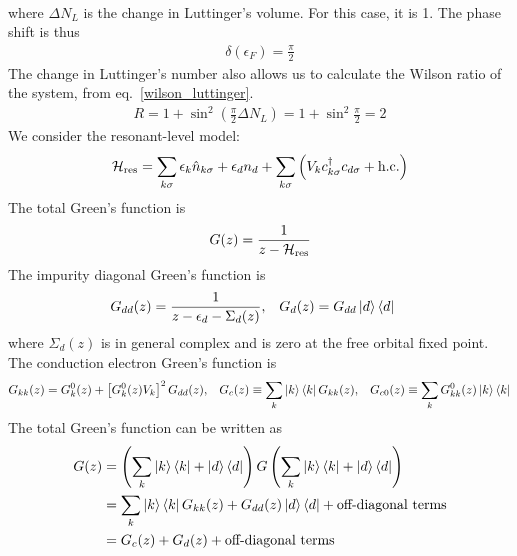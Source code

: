 \documentclass[12pt,twoside]{article}
\numberwithin{equation}{section}
\begin{document}
{\begin{equation}
\begin{aligned}
\end{aligned}\end{equation}
where \(\Delta N_L\) is the change in Luttinger's volume. For this case, it is 1. The phase shift is thus
%
\begin{equation}\begin{aligned}
	\delta(\epsilon_F) = \frac{\pi}{2}
\end{aligned}\end{equation}
The change in Luttinger's number also allows us to calculate the Wilson ratio of the system, from eq.~\ref{wilson_luttinger}.
\begin{equation}\begin{aligned}
	R = 1 + \sin^2 \left( \frac{\pi}{2}\Delta N_L \right) = 1 + \sin^2 \frac{\pi}{2} = 2
\end{aligned}\end{equation}
}
We consider the resonant-level model:
\begin{equation}\begin{aligned}
	\mathcal{H}_\text{res} = \sum_{k\sigma}\epsilon_k \hat n_{k\sigma} + \epsilon_d n_d + \sum_{k\sigma}\left(V_k c^\dagger_{k\sigma} c_{d\sigma} + \text{h.c.}\right)
\end{aligned}\end{equation}
The total Green's function is 
\begin{equation}\begin{aligned}
	G(z) = \frac{1}{z - \mathcal{H}_\text{res}}
\end{aligned}\end{equation}
The impurity diagonal Green's function is
\begin{equation}\begin{aligned}
	G_{dd}(z) &= \frac{1}{z - \epsilon_d - \Sigma_d(z)}, &&	G_d(z) = G_{dd}\ket{d}\bra{d}
\end{aligned}\end{equation}
where \(\Sigma_d(z)\) is in general complex and is zero at the free orbital fixed point. The conduction electron Green's function is 
\begin{equation}\begin{aligned}
	&G_{kk}(z) = G_k^0(z) + \left[G_k^0(z)V_k\right]^2 G_{dd}(z), & G_c(z) \equiv \sum_k \ket{k}\bra{k}G_{kk}(z), && G_{c0}(z) \equiv \sum_k G_{kk}^0(z)\ket{k}\bra{k}
\end{aligned}\end{equation}
The total Green's function can be written as
\begin{equation}\begin{aligned}
	G(z) &= \left(\sum_{k}\ket{k}\bra{k} + \ket{d}\bra{d}\right) G \left(\sum_{k}\ket{k}\bra{k} + \ket{d}\bra{d}\right)\\
	     &= \sum_{k} \ket{k}\bra{k}G_{kk}(z) + G_{dd}(z)\ket{d}\bra{d} + \text{off-diagonal terms}\\
	     &= G_c(z) + G_{d}(z) + \text{off-diagonal terms}
\end{aligned}\end{equation}
\end{document}
